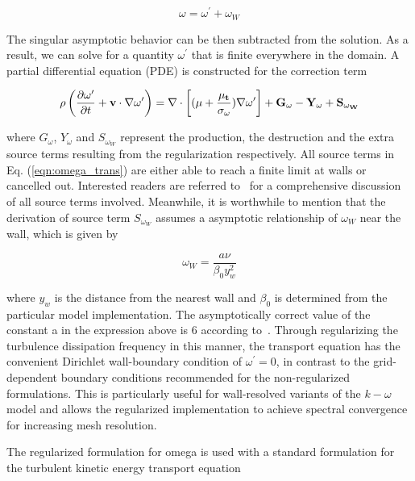 \begin{equation}
    \omega = \omega^\prime + \omega_W 
\end{equation}

The singular asymptotic behavior can be then subtracted from the solution. As a result, we can solve for a quantity $\omega^\prime$ that is finite everywhere in the domain. A partial differential equation (PDE) is constructed for the correction term

\begin{equation}
\label{eqn:omega_trans}
\rho \left( \frac{\partial \omega^\prime}{\partial t} + \bf{v} \cdot \bf{\nabla}  \omega^\prime \right) =  \bf{\nabla} \cdot \left[ (\mu+\frac{\mu_t}{\sigma_\omega } ) \bf{\nabla} \omega^\prime \right] + G_{\omega} - Y_{\omega} + S_{\omega_W}
\end{equation}

where $G_{\omega}$, $Y_{\omega}$ and $S_{\omega_W}$ represent the production, the destruction and the extra source terms resulting from the regularization respectively. All source terms in Eq. (\ref{eqn:omega_trans}) are either able to reach a finite limit at walls or cancelled out. Interested readers are referred to~\cite{Tomboulides2018} for a comprehensive discussion of all source terms involved. Meanwhile, it is worthwhile to mention that the derivation of source term $S_{\omega_W}$ assumes a asymptotic relationship of $\omega_W$ near the wall, which is given by 

\begin{equation}
    \omega_W = \frac{a \nu}{\beta_0 y_w^2} 
\end{equation}

where $y_w$ is the distance from the nearest wall and $\beta_0$ is determined from the particular model implementation. The asymptotically correct value of the constant a in the expression above is 6 according to~\cite{Wilcox1998}. Through regularizing the turbulence dissipation frequency in this manner, the transport equation has the convenient Dirichlet wall-boundary condition of $\omega^\prime = 0$, in contrast to the grid-dependent boundary conditions recommended for the non-regularized formulations. This is particularly useful for wall-resolved variants of the $k-\omega$ model and allows the regularized implementation to achieve spectral convergence for increasing mesh resolution. 

The regularized formulation for omega is used with a standard formulation for the turbulent kinetic energy transport equation~\citep{Wilcox1988}

